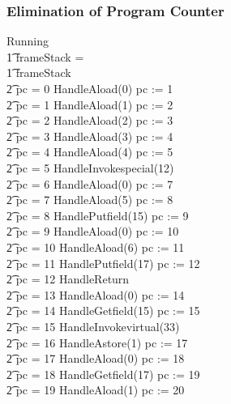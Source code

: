 \documentclass{beamer}
\begin{document}
\begin{frame}
  \frametitle{Elimination of Program Counter}
  \tiny
  \begin{circus}
    Running \circdef \\
    \t1 \circif frameStack = \emptyset \circthen \Skip \\
    \t1 {} \circelse frameStack \neq \emptyset \circthen {} \\
    \t2 {} \circif pc = 0 \circthen HandleAload(0) \circseq pc := 1 \\
    \t2 {} \circelse pc = 1 \circthen HandleAload(1) \circseq pc := 2 \\
    \t2 {} \circelse pc = 2 \circthen HandleAload(2) \circseq pc := 3 \\
    \t2 {} \circelse pc = 3 \circthen HandleAload(3) \circseq pc := 4 \\
    \t2 {} \circelse pc = 4 \circthen HandleAload(4) \circseq pc := 5 \\
    \t2 {} \circelse pc = 5 \circthen HandleInvokespecial(12) \\
    \t2 {} \circelse pc = 6 \circthen HandleAload(0) \circseq pc := 7 \\
    \t2 {} \circelse pc = 7 \circthen HandleAload(5) \circseq pc := 8 \\
    \t2 {} \circelse pc = 8 \circthen HandlePutfield(15) \circseq pc := 9 \\
    \t2 {} \circelse pc = 9 \circthen HandleAload(0) \circseq pc := 10 \\
    \t2 {} \circelse pc = 10 \circthen HandleAload(6) \circseq pc := 11 \\
    \t2 {} \circelse pc = 11 \circthen HandlePutfield(17) \circseq pc := 12 \\
    \t2 {} \circelse pc = 12 \circthen HandleReturn \\
    \t2 {} \circelse pc = 13 \circthen HandleAload(0) \circseq pc := 14 \\
    \t2 {} \circelse pc = 14 \circthen HandleGetfield(15) \circseq pc := 15 \\
    \t2 {} \circelse pc = 15 \circthen HandleInvokevirtual(33) \\
    \t2 {} \circelse pc = 16 \circthen HandleAstore(1) \circseq pc := 17 \\
    \t2 {} \circelse pc = 17 \circthen HandleAload(0) \circseq pc := 18 \\
    \t2 {} \circelse pc = 18 \circthen HandleGetfield(17) \circseq pc := 19 \\
    \t2 {} \circelse pc = 19 \circthen HandleAload(1) \circseq pc := 20 \\

\end{circus}
\end{frame}
\end{document}
